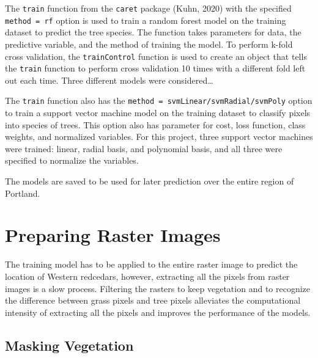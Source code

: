 \documentclass[12pt,twoside]{reedthesis}
\begin{document}
The \texttt{train} function from the \texttt{caret} package (Kuhn, 2020) with the specified \texttt{method\ =\ rf} option is used to train a random forest model on the training dataset to predict the tree species. The function takes parameters for data, the predictive variable, and the method of training the model. To perform k-fold cross validation, the \texttt{trainControl} function is used to create an object that tells the \texttt{train} function to perform cross validation 10 times with a different fold left out each time. Three different models were considered\ldots{}

The \texttt{train} function also has the \texttt{method\ =\ svmLinear/svmRadial/svmPoly} option to train a support vector machine model on the training dataset to classify pixels into species of trees. This option also has parameter for cost, loss function, class weights, and normalized variables. For this project, three support vector machines were trained: linear, radial basis, and polynomial basis, and all three were specified to normalize the variables.

The models are saved to be used for later prediction over the entire region of Portland.

\hypertarget{preparing-raster-images}{%
\section{Preparing Raster Images}\label{preparing-raster-images}}

The training model has to be applied to the entire raster image to predict the location of Western redcedars, however, extracting all the pixels from raster images is a slow process. Filtering the rasters to keep vegetation and to recognize the difference between grass pixels and tree pixels alleviates the computational intensity of extracting all the pixels and improves the performance of the models.

\hypertarget{masking-vegetation}{%
\subsection{Masking Vegetation}\label{masking-vegetation}}
\end{document}
